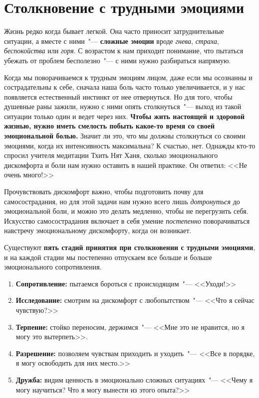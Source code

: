 
\chapter{Столкновение с трудными эмоциями} \label{Meeting_Difficult_Emotions}

Жизнь редко когда бывает легкой. Она часто приносит затруднительные ситуации, а вместе с ними~"--- \textbf{сложные эмоции} вроде \emph{гнева}, \emph{страха}, \emph{беспокойства} или \emph{горя}. С возрастом к нам приходит понимание, что пытаться убежать от проблем бесполезно~"--- с ними нужно разбираться напрямую. 

Когда мы поворачиваемся к трудным эмоциям лицом, даже если мы осознанны и сострадательны к себе, сначала наша боль часто только увеличивается, и у нас появляется естественный инстинкт от нее отвернуться. Но для того, чтобы душевные раны зажили, нужно с ними опять столкнуться~"--- выход из такой ситуации только один и ведет через них. \textbf{Чтобы жить настоящей и здоровой жизнью, нужно иметь смелость побыть какое-то время со своей эмоциональной болью.} Значит ли это, что мы должны столкнуться со своими эмоциями, когда их интенсивность максимальна? К счастью, нет. Однажды кто-то спросил учителя медитации Тхить Нят Ханя, сколько эмоционального дискомфорта и боли нам нужно оставить в нашей практике. Он ответил: <<Не очень много!>> 

Прочувствовать дискомфорт важно, чтобы подготовить почву для самосострадания, но для этой задачи нам нужно всего лишь \emph{дотронуться} до эмоциональной боли, и можно это делать медленно, чтобы не перегрузить себя. Искусство самосострадания включает в себя умение \emph{постепенно} поворачиваться навстречу эмоциональному дискомфорту, когда он возникает. 

\vspace{2ex}

Существуют \textbf{пять стадий принятия при столкновении с трудными эмоциями}, и на каждой стадии мы постепенно отпускаем все больше и больше эмоционального сопротивления. 
\begin{enumerate}
	\item \textbf{Сопротивление:} пытаемся бороться с происходящим~"--- <<Уходи!>>
	\item \textbf{Исследование:} смотрим на дискомфорт с любопытством~"--- <<Что я сейчас чувствую?>>
	\item \textbf{Терпение:} стойко переносим, держимся~"--- <<Мне это не нравится, но я могу это вытерпеть>>.
	\item \textbf{Разрешение:} позволяем чувствам приходить и уходить~"--- <<Все в порядке, я могу освободить для них место.>>
	\item \textbf{Дружба:} видим ценность в эмоционально сложных ситуациях~"--- <<Чему я могу научиться? Что я могу вынести из этого опыта?>>	
\end{enumerate}

